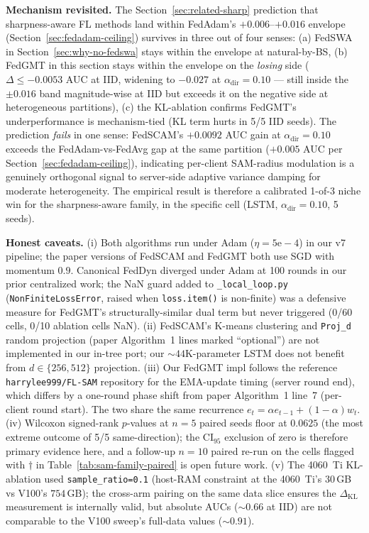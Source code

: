 \documentclass[journal]{IEEEtran}
\newcommand{\alphadir}{\ensuremath{\alpha_{\mathrm{dir}}}}
\begin{document}
\textbf{Mechanism revisited.} The Section~\ref{sec:related-sharp} prediction that sharpness-aware FL methods land within FedAdam's $+0.006$--$+0.016$ envelope (Section~\ref{sec:fedadam-ceiling}) survives in three out of four senses: (a) FedSWA in Section~\ref{sec:why-no-fedswa} stays within the envelope at natural-by-BS, (b) FedGMT in this section stays within the envelope on the \emph{losing} side ($\Delta \leq -0.0053$ AUC at IID, widening to $-0.027$ at $\alphadir = 0.10$ --- still inside the $\pm 0.016$ band magnitude-wise at IID but exceeds it on the negative side at heterogeneous partitions), (c) the KL-ablation confirms FedGMT's underperformance is mechanism-tied (KL term hurts in 5/5 IID seeds). The prediction \emph{fails} in one sense: FedSCAM's $+0.0092$ AUC gain at $\alphadir = 0.10$ exceeds the FedAdam-vs-FedAvg gap at the same partition ($+0.005$ AUC per Section~\ref{sec:fedadam-ceiling}), indicating per-client SAM-radius modulation is a genuinely orthogonal signal to server-side adaptive variance damping for moderate heterogeneity. The empirical result is therefore a calibrated 1-of-3 niche win for the sharpness-aware family, in the specific cell (LSTM, $\alphadir = 0.10$, 5 seeds).

\textbf{Honest caveats.} (i) Both algorithms run under Adam ($\eta = 5\mathrm{e}{-}4$) in our v7 pipeline; the paper versions of FedSCAM and FedGMT both use SGD with momentum $0.9$. Canonical FedDyn diverged under Adam at 100 rounds in our prior centralized work; the NaN guard added to \lstinline|_local_loop.py| (\lstinline|NonFiniteLossError|, raised when \lstinline|loss.item()| is non-finite) was a defensive measure for FedGMT's structurally-similar dual term but never triggered (0/60 cells, 0/10 ablation cells NaN). (ii) FedSCAM's K-means clustering and \lstinline|Proj_d| random projection (paper Algorithm~1 lines marked ``optional'') are not implemented in our in-tree port; our $\sim 44$K-parameter LSTM does not benefit from $d \in \{256, 512\}$ projection. (iii) Our FedGMT impl follows the reference \verb|harrylee999/FL-SAM| repository for the EMA-update timing (server round end), which differs by a one-round phase shift from paper Algorithm~1 line~7 (per-client round start). The two share the same recurrence $e_t = \alpha e_{t-1} + (1-\alpha) w_t$. (iv) Wilcoxon signed-rank $p$-values at $n = 5$ paired seeds floor at $0.0625$ (the most extreme outcome of 5/5 same-direction); the CI$_{95}$ exclusion of zero is therefore primary evidence here, and a follow-up $n = 10$ paired re-run on the cells flagged with $\dagger$ in Table~\ref{tab:sam-family-paired} is open future work. (v) The 4060~Ti KL-ablation used \verb|sample_ratio=0.1| (host-RAM constraint at the 4060~Ti's $30$\,GB vs V100's $754$\,GB); the cross-arm pairing on the same data slice ensures the $\Delta_{\mathrm{KL}}$ measurement is internally valid, but absolute AUCs ($\sim 0.66$ at IID) are not comparable to the V100 sweep's full-data values ($\sim 0.91$).
\end{document}
